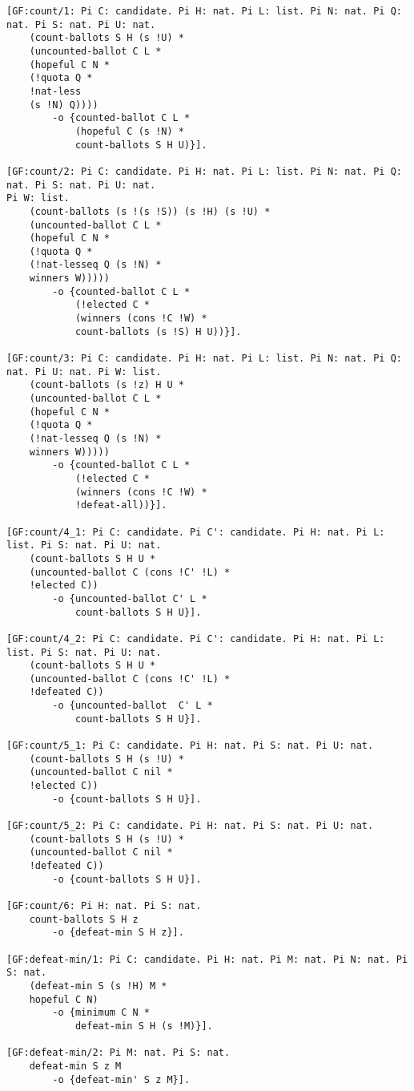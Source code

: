 \begin{lstlisting}[basicstyle=\footnotesize\ttfamily,numbers=none]
[GF:count/1: Pi C: candidate. Pi H: nat. Pi L: list. Pi N: nat. Pi Q: nat. Pi S: nat. Pi U: nat. 
	(count-ballots S H (s !U) *
	(uncounted-ballot C L *
	(hopeful C N *
	(!quota Q *
	!nat-less 
	(s !N) Q)))) 
		-o {counted-ballot C L *
			(hopeful C (s !N) *
			count-ballots S H U)}].

[GF:count/2: Pi C: candidate. Pi H: nat. Pi L: list. Pi N: nat. Pi Q: nat. Pi S: nat. Pi U: nat.  
Pi W: list. 
	(count-ballots (s !(s !S)) (s !H) (s !U) *
	(uncounted-ballot C L *
	(hopeful C N *
	(!quota Q *
	(!nat-lesseq Q (s !N) *
	winners W))))) 
		-o {counted-ballot C L *
			(!elected C *
			(winners (cons !C !W) *
			count-ballots (s !S) H U))}].

[GF:count/3: Pi C: candidate. Pi H: nat. Pi L: list. Pi N: nat. Pi Q: nat. Pi U: nat. Pi W: list. 
	(count-ballots (s !z) H U *
	(uncounted-ballot C L *
	(hopeful C N *
	(!quota Q *
	(!nat-lesseq Q (s !N) *
	winners W))))) 
		-o {counted-ballot C L *
			(!elected C *
			(winners (cons !C !W) *
			!defeat-all))}].

[GF:count/4_1: Pi C: candidate. Pi C': candidate. Pi H: nat. Pi L: list. Pi S: nat. Pi U: nat. 
	(count-ballots S H U *
	(uncounted-ballot C (cons !C' !L) *
	!elected C))  
		-o {uncounted-ballot C' L *
			count-ballots S H U}].

[GF:count/4_2: Pi C: candidate. Pi C': candidate. Pi H: nat. Pi L: list. Pi S: nat. Pi U: nat. 
	(count-ballots S H U *
	(uncounted-ballot C (cons !C' !L) *
	!defeated C))  
		-o {uncounted-ballot  C' L *
			count-ballots S H U}].

[GF:count/5_1: Pi C: candidate. Pi H: nat. Pi S: nat. Pi U: nat. 
	(count-ballots S H (s !U) *
	(uncounted-ballot C nil *
	!elected C)) 
		-o {count-ballots S H U}].

[GF:count/5_2: Pi C: candidate. Pi H: nat. Pi S: nat. Pi U: nat. 
	(count-ballots S H (s !U) *
	(uncounted-ballot C nil *
	!defeated C)) 
		-o {count-ballots S H U}].

[GF:count/6: Pi H: nat. Pi S: nat. 
	count-ballots S H z 
		-o {defeat-min S H z}].

[GF:defeat-min/1: Pi C: candidate. Pi H: nat. Pi M: nat. Pi N: nat. Pi S: nat. 
	(defeat-min S (s !H) M *
	hopeful C N) 
		-o {minimum C N *
			defeat-min S H (s !M)}].

[GF:defeat-min/2: Pi M: nat. Pi S: nat. 
	defeat-min S z M 
		-o {defeat-min' S z M}].


\end{lstlisting}
